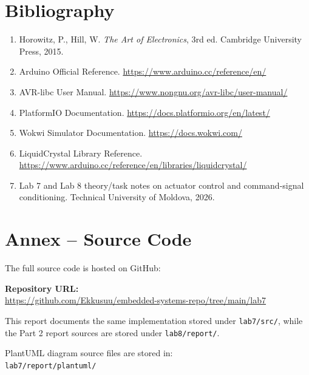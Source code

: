\documentclass[12pt]{article}
\begin{document}
\section*{Bibliography}
\begin{enumerate}
    \item Horowitz, P., Hill, W. \textit{The Art of Electronics}, 3rd ed. Cambridge University Press, 2015.
    \item Arduino Official Reference. \url{https://www.arduino.cc/reference/en/}
    \item AVR-libc User Manual. \url{https://www.nongnu.org/avr-libc/user-manual/}
    \item PlatformIO Documentation. \url{https://docs.platformio.org/en/latest/}
    \item Wokwi Simulator Documentation. \url{https://docs.wokwi.com/}
    \item LiquidCrystal Library Reference. \url{https://www.arduino.cc/reference/en/libraries/liquidcrystal/}
    \item Lab 7 and Lab 8 theory/task notes on actuator control and command-signal conditioning. Technical University of Moldova, 2026.
\end{enumerate}

\FloatBarrier
\section*{Annex -- Source Code}
The full source code is hosted on GitHub:

\bigskip
\noindent\textbf{Repository URL:}\\
\url{https://github.com/Ekkusuu/embedded-systems-repo/tree/main/lab7}

\bigskip
\noindent This report documents the same implementation stored under \texttt{lab7/src/}, while the Part 2 report sources are stored under \texttt{lab8/report/}.

\bigskip
\noindent PlantUML diagram source files are stored in:\\
\texttt{lab7/report/plantuml/}
\end{document}

